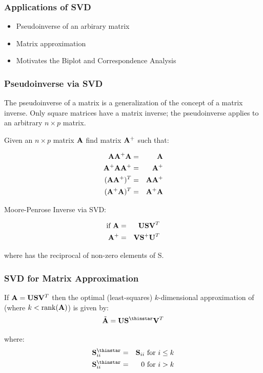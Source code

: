 \documentclass{beamer}
\DeclareMathOperator{\rank}{rank}
\begin{document}
\begin{frame}
  \frametitle{Applications of SVD}

\begin{itemize}
\item Pseudoinverse of an arbirary matrix
\item Matrix approximation
\item Motivates the Biplot and Correspondence Analysis
\end{itemize}

\end{frame}


\begin{frame}
  \frametitle{Pseudoinverse via SVD}

The pseudoinverse of a matrix is a generalization of the concept of a matrix inverse. Only square matrices have a matrix inverse; the pseudoinverse applies to an arbitrary $n \times p$ matrix.

\smallskip
Given an $n \times p$ matrix $\mathbf{A}$ find matrix $\mathbf{A}^{+}$ such that:

\begin{eqnarray*}
\mathbf{A} \mathbf{A}^{+} \mathbf{A} & = & \mathbf{A} \\
\mathbf{A}^{+} \mathbf{A} \mathbf{A}^{+} & = & \mathbf{A}^{+}\\
(\mathbf{A} \mathbf{A}^{+})^T & = & \mathbf{A} \mathbf{A}^{+}\\
(\mathbf{A}^{+} \mathbf{A})^T & = & \mathbf{A}^{+} \mathbf{A}
\end{eqnarray*}

\smallskip
Moore-Penrose Inverse via SVD:

\begin{eqnarray*}
\text{if}\ \mathbf{A} &=& \mathbf{U}\mathbf{S}\mathbf{V}^T \\
\mathbf{A}^{+} &=& \mathbf{V} \mathbf{S}^{+}  \mathbf{U}^T
\end{eqnarray*}

where  has the reciprocal of non-zero elements of S.

\end{frame}

\begin{frame}
  \frametitle{SVD for Matrix Approximation}

If $ \mathbf{A} = \mathbf{U} \mathbf{S} \mathbf{V}^T $
then the optimal (least-squares) $k$-dimensional approximation of  (where $ k < \rank(\Mtx{A})$) is given by:
$$ \tilde{\Mtx{A}} = \Mtx{U}\Mtx{S}^{\thinstar} \Mtx{V}^T$$ 

where:
\begin{eqnarray*}
\Mtx{S}_{ii}^{\thinstar} &=& \Mtx{S}_{ii} \text{ for } i \leq k\\
\Mtx{S}_{ii}^{\thinstar} &=& 0 \text{ for } i > k\\
\end{eqnarray*}

\end{frame}
\end{document}
